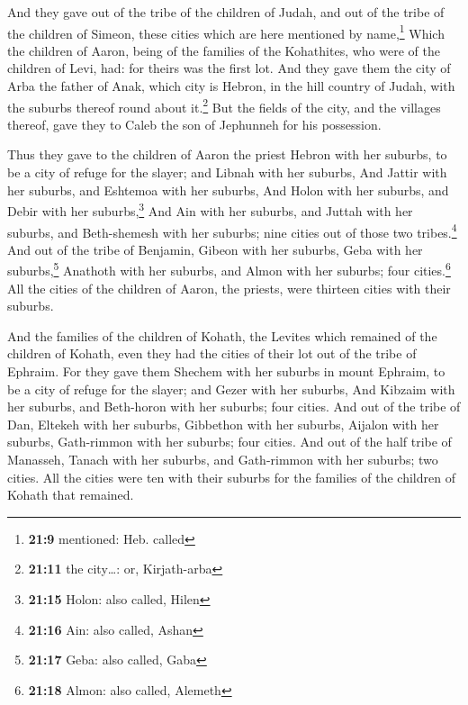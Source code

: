  And they gave out of the tribe of the children of Judah,
and out of the tribe of the children of Simeon, these cities which are
here mentioned by name,\footnote{\textbf{21:9} mentioned: Heb. called}
 Which the children of Aaron, being of the families of
the Kohathites, who were of the children of Levi, had: for theirs was
the first lot.  And they gave them the city of Arba the
father of Anak, which city is Hebron, in the hill country of Judah, with
the suburbs thereof round about it.\footnote{\textbf{21:11} the
  city\ldots: or, Kirjath-arba}  But the fields of the
city, and the villages thereof, gave they to Caleb the son of Jephunneh
for his possession.

 Thus they gave to the children of Aaron the priest
Hebron with her suburbs, to be a city of refuge for the slayer; and
Libnah with her suburbs,  And Jattir with her suburbs,
and Eshtemoa with her suburbs,  And Holon with her
suburbs, and Debir with her suburbs,\footnote{\textbf{21:15} Holon: also
  called, Hilen}  And Ain with her suburbs, and Juttah
with her suburbs, and Beth-shemesh with her suburbs; nine cities out of
those two tribes.\footnote{\textbf{21:16} Ain: also called, Ashan}
 And out of the tribe of Benjamin, Gibeon with her
suburbs, Geba with her suburbs,\footnote{\textbf{21:17} Geba: also
  called, Gaba}  Anathoth with her suburbs, and Almon
with her suburbs; four cities.\footnote{\textbf{21:18} Almon: also
  called, Alemeth}  All the cities of the children of
Aaron, the priests, were thirteen cities with their suburbs.

 And the families of the children of Kohath, the Levites
which remained of the children of Kohath, even they had the cities of
their lot out of the tribe of Ephraim.  For they gave
them Shechem with her suburbs in mount Ephraim, to be a city of refuge
for the slayer; and Gezer with her suburbs,  And Kibzaim
with her suburbs, and Beth-horon with her suburbs; four cities.
 And out of the tribe of Dan, Eltekeh with her suburbs,
Gibbethon with her suburbs,  Aijalon with her suburbs,
Gath-rimmon with her suburbs; four cities.  And out of
the half tribe of Manasseh, Tanach with her suburbs, and Gath-rimmon
with her suburbs; two cities.  All the cities were ten
with their suburbs for the families of the children of Kohath that
remained.


